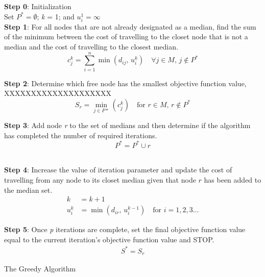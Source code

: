 \documentclass[11pt]{article}
\begin{document}
	\begin{algorithm}[H]
		
		\BlankLine
		{\bfseries Step 0}: Initialization \\
		Set $P^{*} = \emptyset$; \emph{k} = 1; and $u_i^1 = \infty$\\
		
		\BlankLine
		{\bfseries Step 1}: For all nodes that are not already designated as a median, find the sum of the minimum between the cost of travelling to the closet node that is not a median and the cost of travelling to the closest median.
		\begin{equation*}
		c_j^k = \sum_{i=1}^{n}\min(d_{ij} \text{, } u_i^k) \quad \forall j \in M \text{, } j \notin P^*
		\end{equation*}
		
		\BlankLine
		{\bfseries Step 2}: Determine which free node has the smallest objective function value, XXXXXXXXXXXXXXXXXXXX
		\begin{equation*}
		S_r = \min_{j \in P*}(c_j^k) \quad \text{for } r \in M \text{, } r \notin P^*
		\end{equation*}
		
		\BlankLine
		{\bfseries Step 3}: Add node \emph{r} to the set of medians and then determine if the algorithm has completed the number of required iterations.
		\begin{equation*}
		P^* = P^* \cup r
		\end{equation*}\\
			
		\BlankLine
		{\bfseries Step 4}: Increase the value of iteration parameter and update the cost of travelling from any node to its closet median given that node $r$ has been added to the median set.
		\begin{align*}
		k &= k+1\\
		u_i^k &= \min(d_{ir} \text{, } u_i^{k-1}) \quad \text{for } i = 1,2,3 \dots
		\end{align*}
		
		
				
		\BlankLine
		{\bfseries Step 5}: Once \emph{p} iterations are complete, set the final objective function value equal to the current iteration's objective function value and STOP.
		\begin{align*}
		S^{*} = S_r 
		\end{align*}
				
		\caption{The Greedy Algorithm}
	\end{algorithm}
		
\end{document}
